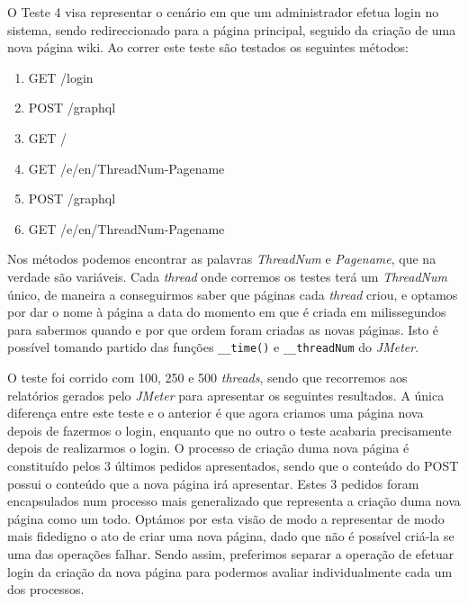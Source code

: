 O Teste 4 visa representar o cenário em que um administrador efetua login no sistema, sendo redireccionado para a página principal, seguido da criação de uma nova página wiki. Ao correr este teste são testados os seguintes métodos:

\begin{enumerate}
    \item GET /login
    \item POST /graphql
    \item GET /
    \item GET /e/en/ThreadNum-Pagename
    \item POST /graphql
    \item GET /e/en/ThreadNum-Pagename
\end{enumerate}

Nos métodos podemos encontrar as palavras \textit{ThreadNum} e \textit{Pagename}, que na verdade são variáveis. Cada \textit{thread} onde corremos os testes terá um \textit{ThreadNum} único, de maneira a conseguirmos saber que páginas cada \textit{thread} criou, e optamos por dar o nome à página a data do momento em que é criada em milissegundos para sabermos quando e por que ordem foram criadas as novas páginas. Isto é possível tomando partido das funções \texttt{\_\_time()} e \texttt{\_\_threadNum} do \textit{JMeter}.

O teste foi corrido com 100, 250 e 500 \textit{threads}, sendo que recorremos aos relatórios gerados pelo \textit{JMeter} para apresentar os seguintes resultados. A única diferença entre este teste e o anterior é que agora criamos uma página nova depois de fazermos o login, enquanto que no outro o teste acabaria precisamente depois de realizarmos o login. O processo de criação duma nova página é constituído pelos 3 últimos pedidos apresentados, sendo que o conteúdo do POST possui o conteúdo que a nova página irá apresentar. Estes 3 pedidos foram encapsulados num processo mais generalizado que representa a criação duma nova página como um todo. Optámos por esta visão de modo a representar de modo mais fidedigno o ato de criar uma nova página, dado que não é possível criá-la se uma das operações falhar. Sendo assim, preferimos separar a operação de efetuar login da criação da nova página para podermos avaliar individualmente cada um dos processos. 


